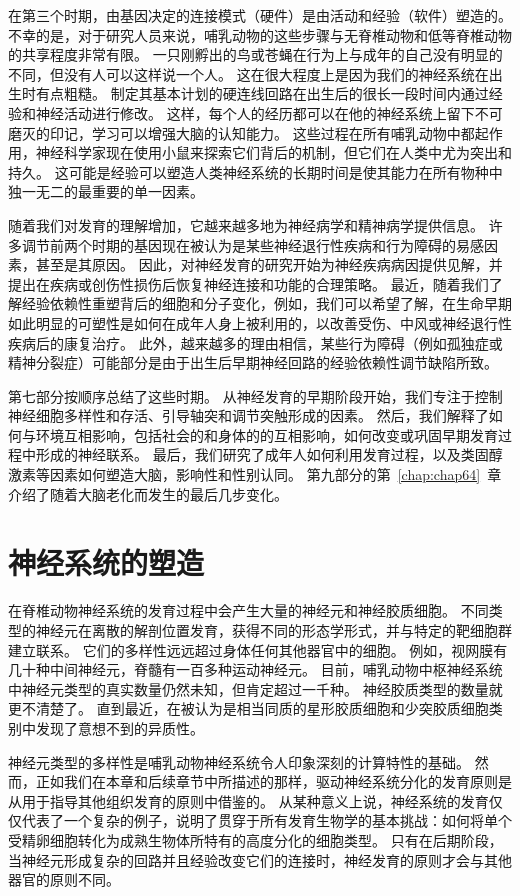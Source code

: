 在第三个时期，由基因决定的连接模式（硬件）是由活动和经验（软件）塑造的。
不幸的是，对于研究人员来说，哺乳动物的这些步骤与无脊椎动物和低等脊椎动物的共享程度非常有限。
一只刚孵出的鸟或苍蝇在行为上与成年的自己没有明显的不同，但没有人可以这样说一个人。
这在很大程度上是因为我们的神经系统在出生时有点粗糙。
制定其基本计划的硬连线回路在出生后的很长一段时间内通过经验和神经活动进行修改。
这样，每个人的经历都可以在他的神经系统上留下不可磨灭的印记，学习可以增强大脑的认知能力。
这些过程在所有哺乳动物中都起作用，神经科学家现在使用小鼠来探索它们背后的机制，但它们在人类中尤为突出和持久。
这可能是经验可以塑造人类神经系统的长期时间是使其能力在所有物种中独一无二的最重要的单一因素。


随着我们对发育的理解增加，它越来越多地为神经病学和精神病学提供信息。
许多调节前两个时期的基因现在被认为是某些神经退行性疾病和行为障碍的易感因素，甚至是其原因。
因此，对神经发育的研究开始为神经疾病病因提供见解，并提出在疾病或创伤性损伤后恢复神经连接和功能的合理策略。
最近，随着我们了解经验依赖性重塑背后的细胞和分子变化，例如，我们可以希望了解，在生命早期如此明显的可塑性是如何在成年人身上被利用的，以改善受伤、中风或神经退行性疾病后的康复治疗。
此外，越来越多的理由相信，某些行为障碍（例如孤独症或精神分裂症）可能部分是由于出生后早期神经回路的经验依赖性调节缺陷所致。


第七部分按顺序总结了这些时期。
从神经发育的早期阶段开始，我们专注于控制神经细胞多样性和存活、引导轴突和调节突触形成的因素。
然后，我们解释了如何与环境互相影响，包括社会的和身体的的互相影响，如何改变或巩固早期发育过程中形成的神经联系。
最后，我们研究了成年人如何利用发育过程，以及类固醇激素等因素如何塑造大脑，影响性和性别认同。
第九部分的第~\ref{chap:chap64}~章介绍了随着大脑老化而发生的最后几步变化。



\chapter{神经系统的塑造} \label{chap:chap45}

在脊椎动物神经系统的发育过程中会产生大量的神经元和神经胶质细胞。
不同类型的神经元在离散的解剖位置发育，获得不同的形态学形式，并与特定的靶细胞群建立联系。
它们的多样性远远超过身体任何其他器官中的细胞。
例如，视网膜有几十种中间神经元，脊髓有一百多种运动神经元。
目前，哺乳动物中枢神经系统中神经元类型的真实数量仍然未知，但肯定超过一千种。
神经胶质类型的数量就更不清楚了。
直到最近，在被认为是相当同质的星形胶质细胞和少突胶质细胞类别中发现了意想不到的异质性。


神经元类型的多样性是哺乳动物神经系统令人印象深刻的计算特性的基础。
然而，正如我们在本章和后续章节中所描述的那样，驱动神经系统分化的发育原则是从用于指导其他组织发育的原则中借鉴的。
从某种意义上说，神经系统的发育仅仅代表了一个复杂的例子，说明了贯穿于所有发育生物学的基本挑战：如何将单个受精卵细胞转化为成熟生物体所特有的高度分化的细胞类型。
只有在后期阶段，当神经元形成复杂的回路并且经验改变它们的连接时，神经发育的原则才会与其他器官的原则不同。


